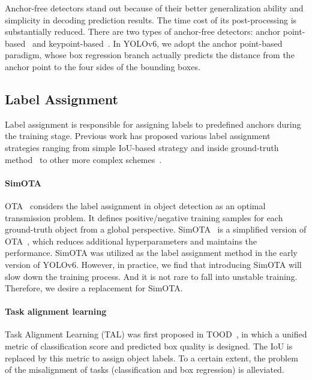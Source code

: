 \documentclass[10pt,twocolumn,letterpaper]{article}
\begin{document}
  Anchor-free detectors stand out because of their better generalization ability and simplicity in decoding prediction results. The time cost of its post-processing is substantially reduced. There are two types of anchor-free detectors: anchor point-based~\cite{tian2019fcos,ge2021yolox} and keypoint-based~\cite{zhou2019objects,law2018cornernet,yang2019reppoints}. In YOLOv6, we adopt the anchor point-based paradigm, whose box regression branch actually predicts the distance from the anchor point to the four sides of the bounding boxes.
  




  \subsection{Label Assignment}
  \label{sec:labelassign}
  Label assignment is responsible for assigning labels to predefined anchors during the training stage. Previous work has proposed various label assignment strategies ranging from simple IoU-based strategy and inside ground-truth method~\cite{tian2019fcos} to other more complex schemes~\cite{zhang2020atss,ge2021yolox,feng2021tood,dw_CVPR,Zand2022ObjectBoxFC}.
  
  \paragraph{SimOTA}
  OTA~\cite{Ge2021OTAOT} considers the label assignment in object detection as an optimal transmission problem. It defines positive/negative training samples for each ground-truth object from a global perspective. SimOTA~\cite{ge2021yolox} is a simplified version of OTA~\cite{Ge2021OTAOT}, which reduces additional hyperparameters and maintains the performance. SimOTA was utilized as the label assignment method in the early version of YOLOv6. However, in practice, we find that introducing SimOTA will slow down the training process. And it is not rare to fall into unstable training. Therefore, we desire a replacement for SimOTA.

  \paragraph{Task alignment learning}
  Task Alignment Learning (TAL) was first proposed in TOOD~\cite{feng2021tood}, in which a unified metric of classification score and predicted box quality is designed. The IoU is replaced by this metric to assign object labels. To a certain extent, the problem of the misalignment of tasks (classification and box regression) is alleviated.
 
\end{document}
